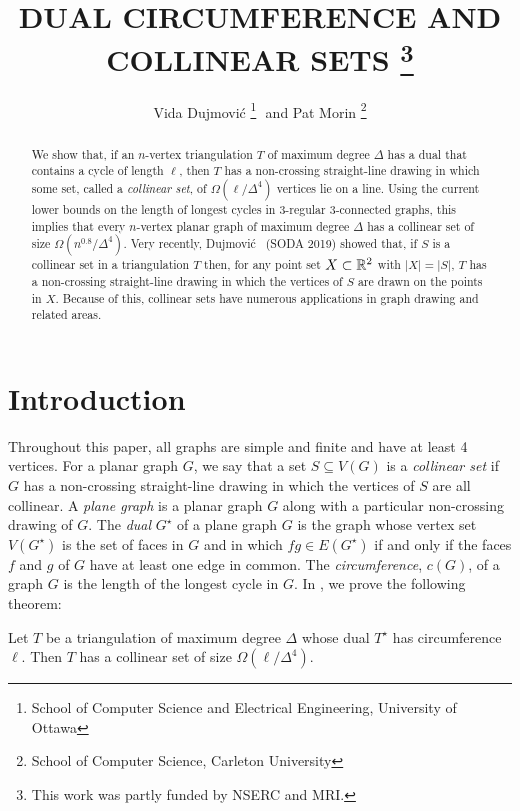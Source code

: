 \documentclass{patmorin}
\title{\MakeUppercase{Dual Circumference and Collinear Sets}%
    \thanks{This work was partly funded by NSERC and MRI.}}
\author{Vida Dujmovi\'c%
        \thanks{School of Computer Science and Electrical Engineering, 
                University of Ottawa}\,\, and 
        Pat Morin%
        \thanks{School of Computer Science, Carleton University}}
\newcommand{\dual}[1]{{#1}^\star}
\begin{document}
\maketitle


\begin{abstract}
   We show that, if an $n$-vertex triangulation $T$ of maximum degree
   $\Delta$ has a dual that contains a cycle of length $\ell$, then $T$
   has a non-crossing straight-line drawing in which some set, called
   a \emph{collinear set}, of $\Omega(\ell/\Delta^4)$ vertices lie on
   a line.  Using the current lower bounds on the length of longest cycles
   in 3-regular 3-connected graphs, this implies that every $n$-vertex
   planar graph of maximum degree $\Delta$ has a collinear set of size
   $\Omega(n^{0.8}/\Delta^4)$.  Very recently, Dujmovi\'c \etal\ (SODA
   2019) showed that, if $S$ is a collinear set in a triangulation $T$
   then, for any point set $X\subset\mathbb{R}^2$ with $|X|=|S|$, $T$ has a
   non-crossing straight-line drawing in which the vertices of $S$ are
   drawn on the points in $X$.  Because of this, collinear sets have
   numerous applications in graph drawing and related areas.
\end{abstract}

\section{Introduction}

Throughout this paper, all graphs are simple and finite and have at least
4 vertices.  For a planar graph $G$, we say that a set $S\subseteq V(G)$
is a \emph{collinear set} if $G$ has a non-crossing straight-line drawing
in which the vertices of $S$ are all collinear.  A \emph{plane graph} is
a planar graph $G$ along with a particular non-crossing drawing of $G$.
The \emph{dual} $\dual{G}$ of a plane graph $G$ is the graph whose
vertex set $V(\dual{G})$ is the set of faces in $G$ and in which $fg\in
E(\dual{G})$ if and only if the faces $f$ and $g$ of $G$ have at least
one edge in common.  The \emph{circumference}, $c(G)$, of a graph $G$
is the length of the longest cycle in $G$. In , we prove
the following theorem:

\begin{thm}
  Let $T$ be a triangulation of maximum degree $\Delta$ whose dual
  $\dual{T}$ has circumference $\ell$. Then $T$ has a collinear set of
  size $\Omega(\ell/\Delta^4)$.
\end{thm}
\end{document}
